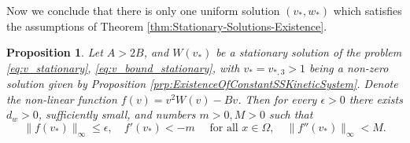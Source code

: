 \documentclass[11pt, a4paper]{article}
\theoremstyle{break}
\theoremstyle{break}
\newtheorem{prp}{Proposition}[section]
\theoremstyle{break}
\theoremstyle{break}
\theoremstyle{break}
\theoremstyle{break}
\theoremstyle{break}
\theoremstyle{break}
\theoremstyle{break}
\theoremstyle{break}
\begin{document}
Now we conclude that there is only one uniform solution $(v_*, w_*)$ which satisfies the assumptions of Theorem \ref{thm:Stationary-Solutions-Existence}.

\begin{prp}
    \label{prp:nonlinearity_f_properties_at_v_star}
    Let $A > 2B$, and $W(v_*)$ be a stationary solution of the problem \eqref{eq:v_stationary}, \eqref{eq:v_bound_stationary}, with $v_* = v_{*, 3} > 1$ being a non-zero solution given by Proposition \ref{prp:ExistenceOfConstantSSKineticSystem}. Denote the non-linear function $f(v) = v^2W(v) - Bv$. Then for every $\epsilon > 0$ there exists $d_w > 0$, sufficiently small, and numbers $m > 0, M >0$ such that
    \begin{equation}
        \label{eq:nonlinearity_f_condition_existence}
        \|f(v_*)\|_\infty \leq \epsilon, 
        \quad
        f'(v_*) < -m
        \quad
        \text{ for all }
        x \in \Omega,
        \quad
        \|f''(v_*)\|_\infty < M.
    \end{equation}
\end{prp}
\end{document}

